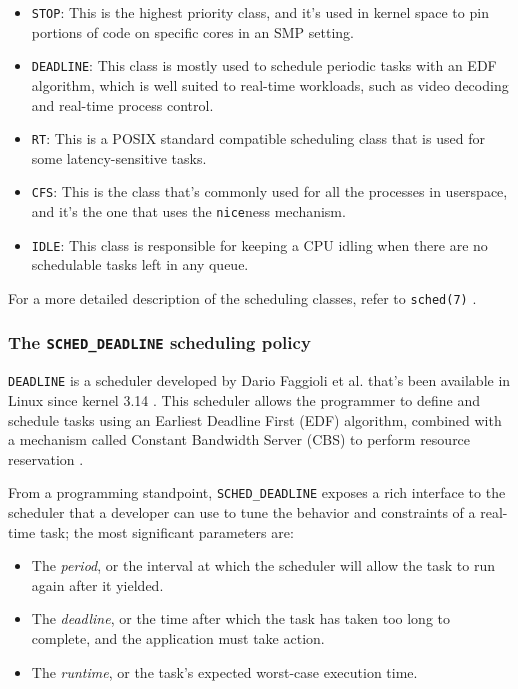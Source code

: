 \documentclass[a4paper,12pt]{report}
\begin{document}
\begin{itemize}
    \item \texttt{STOP}: This is the highest priority class, and it's used in kernel space to pin portions of code on specific cores in an SMP setting.
    \item \texttt{DEADLINE}: This class is mostly used to schedule periodic tasks with an EDF algorithm, which is well suited to real-time workloads, such as video decoding and real-time process control.
    \item \texttt{RT}: This is a POSIX standard compatible scheduling class that is used for some latency-sensitive tasks.
    \item \texttt{CFS}: This is the class that's commonly used for all the processes in userspace, and it's the one that uses the \texttt{nice}ness mechanism.
    \item \texttt{IDLE}: This class is responsible for keeping a CPU idling when there are no schedulable tasks left in any queue.
\end{itemize}

For a more detailed description of the scheduling classes, refer to \texttt{sched(7)} \cite{man-sched-7}.

\subsubsection{The \texttt{SCHED\_DEADLINE} scheduling policy}

\texttt{DEADLINE} is a scheduler developed by Dario Faggioli et al. \cite{lwn-faggioli-mail} that's been available in Linux since kernel 3.14 \cite{kn-linux-314}. This scheduler allows the programmer to define and schedule tasks using an Earliest Deadline First (EDF) algorithm, combined with a mechanism called Constant Bandwidth Server (CBS) to perform resource reservation \cite{cbs-algorithm}.

From a programming standpoint, \texttt{SCHED\_DEADLINE} exposes a rich interface to the scheduler that a developer can use to tune the behavior and constraints of a real-time task; the most significant parameters are: 

\begin{itemize}
    \item The \textit{period}, or the interval at which the scheduler will allow the task to run again after it yielded.
    \item The \textit{deadline}, or the time after which the task has taken too long to complete, and the application must take action.
    \item The \textit{runtime}, or the task's expected worst-case execution time.
\end{itemize}
\end{document}
